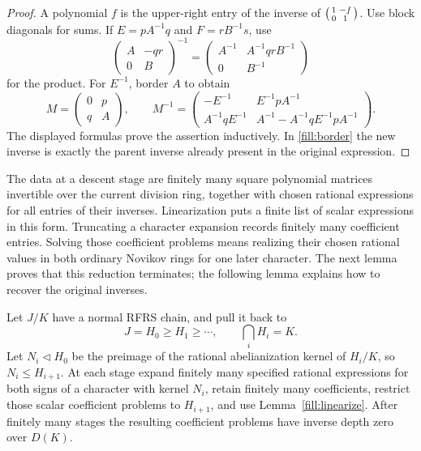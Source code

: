 \begin{proof}
A polynomial \(f\) is the upper-right entry of the inverse of
\(\begin{psmallmatrix}1&-f\\0&1\end{psmallmatrix}\).
Use block diagonals for sums.  If \(E=pA^{-1}q\) and \(F=rB^{-1}s\),
use
\[
 \begin{pmatrix}A&-qr\\0&B\end{pmatrix}^{-1}
 =
 \begin{pmatrix}
 A^{-1}&A^{-1}qrB^{-1}\\0&B^{-1}
 \end{pmatrix}
\]
for the product.  For \(E^{-1}\), border \(A\) to obtain
\begin{equation}
 M=\begin{pmatrix}0&p\\q&A\end{pmatrix},\qquad
 M^{-1}=
 \begin{pmatrix}
 -E^{-1}&E^{-1}pA^{-1}\\
 A^{-1}qE^{-1}&A^{-1}-A^{-1}qE^{-1}pA^{-1}
 \end{pmatrix}.
 \label{fill:border}
\end{equation}
The displayed formulas prove the assertion inductively.  In
\eqref{fill:border} the new inverse is exactly the parent inverse
already present in the original expression.
\end{proof}

The data at a descent stage are finitely many square polynomial
matrices invertible over the current division ring, together with
chosen rational expressions for all entries of their inverses.
Linearization puts a finite list of scalar expressions in this form.
Truncating a character expansion records finitely many coefficient
entries. Solving those coefficient problems means realizing their
chosen rational values in both ordinary Novikov rings for one later
character. The next lemma proves that this reduction terminates;
the following lemma explains how to recover the original inverses.

\begin{lemma}\label{fill:ancestry}
Let \(J/K\) have a normal RFRS chain, and pull it back to
\[
 J=H_0\ge H_1\ge\cdots,\qquad \bigcap_iH_i=K.
\]
Let \(N_i\lhd H_0\) be the preimage of the rational abelianization
kernel of \(H_i/K\), so \(N_i\le H_{i+1}\).
At each stage expand finitely many specified rational expressions
for both signs of a character with kernel \(N_i\), retain finitely
many coefficients, restrict those scalar coefficient problems to
\(H_{i+1}\), and use Lemma~\ref{fill:linearize}.
After finitely many stages the resulting coefficient problems have
inverse depth zero over \(D(K)\).
\end{lemma}

